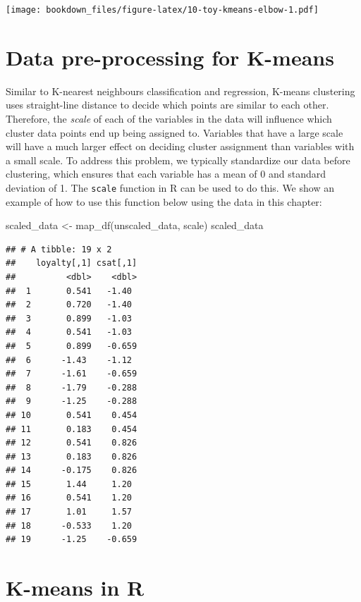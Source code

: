 \documentclass[
]{krantz}
\makeatletter
\newenvironment{Shaded}{\begin{snugshade}}{\end{snugshade}}
\newcommand{\FunctionTok}[1]{\textcolor[rgb]{0,0,0}{#1}}
\newcommand{\NormalTok}[1]{#1}
\newcommand{\OtherTok}[1]{\textcolor[rgb]{0.37,0.37,0.37}{#1}}
\newenvironment{kframe}{%
\medskip{}
\setlength{\fboxsep}{.8em}
 \def\at@end@of@kframe{}%
 \ifinner\ifhmode%
  \def\at@end@of@kframe{\end{minipage}}%
  \begin{minipage}{\columnwidth}%
 \fi\fi%
 \def\FrameCommand##1{\hskip\@totalleftmargin \hskip-\fboxsep
 \colorbox{shadecolor}{##1}\hskip-\fboxsep
     \hskip-\linewidth \hskip-\@totalleftmargin \hskip\columnwidth}%
 \MakeFramed {\advance\hsize-\width
   \@totalleftmargin\z@ \linewidth\hsize
   \@setminipage}}%
 {\par\unskip\endMakeFramed%
 \at@end@of@kframe}
\renewenvironment{Shaded}{\begin{kframe}}{\end{kframe}}
\makeatother
\begin{document}
\texttt{[image: bookdown\_files/figure-latex/10-toy-kmeans-elbow-1.pdf]}

\hypertarget{data-pre-processing-for-k-means}{%
\section{Data pre-processing for K-means}\label{data-pre-processing-for-k-means}}

Similar to K-nearest neighbours classification and regression, K-means
clustering uses straight-line distance to decide which points are similar to
each other. Therefore, the \emph{scale} of each of the variables in the data
will influence which cluster data points end up being assigned to.
Variables that have a large scale will have a much larger
effect on deciding cluster assignment than variables with a small scale.
To address this problem, we typically standardize our data before clustering,
which ensures that each variable has a mean of 0 and standard deviation of 1.
The \texttt{scale} function in R can be used to do this.
We show an example of how to use this function
below using the data in this chapter:

\begin{Shaded}
\begin{Highlighting}[]
\NormalTok{scaled\_data }\OtherTok{\textless{}{-}} \FunctionTok{map\_df}\NormalTok{(unscaled\_data, scale)}
\NormalTok{scaled\_data}
\end{Highlighting}
\end{Shaded}

\begin{verbatim}
## # A tibble: 19 x 2
##    loyalty[,1] csat[,1]
##          <dbl>    <dbl>
##  1       0.541   -1.40 
##  2       0.720   -1.40 
##  3       0.899   -1.03 
##  4       0.541   -1.03 
##  5       0.899   -0.659
##  6      -1.43    -1.12 
##  7      -1.61    -0.659
##  8      -1.79    -0.288
##  9      -1.25    -0.288
## 10       0.541    0.454
## 11       0.183    0.454
## 12       0.541    0.826
## 13       0.183    0.826
## 14      -0.175    0.826
## 15       1.44     1.20 
## 16       0.541    1.20 
## 17       1.01     1.57 
## 18      -0.533    1.20 
## 19      -1.25    -0.659
\end{verbatim}

\hypertarget{k-means-in-r}{%
\section{K-means in R}\label{k-means-in-r}}
\end{document}
